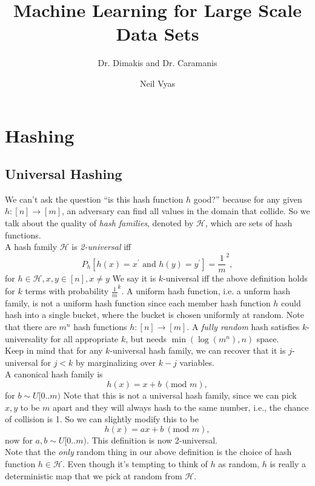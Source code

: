 \documentclass{notes}
\title{Machine Learning for Large Scale Data Sets}
\subtitle{Dr. Dimakis and Dr. Caramanis}
\author{Neil Vyas}
\begin{document}
\maketitle
\tableofcontents

\section{Hashing}
\subsection{Universal Hashing}
We can't ask the question ``is this hash function $h$ good?'' because for any given $h: [n]\to[m]$, 
an adversary can find all values in the domain that collide. So we talk about the quality of \emph{
hash families}, denoted by $\mathcal{H}$, which are sets of hash functions. \\

A hash family $\mathcal{H}$ is \emph{2-universal} iff $$P_h[h(x) = x^\prime\text{ and } h(y) = y^\prime] = 
\frac{1}{m}^2,$$ for $h\in\mathcal{H}, x,y\in [n], x\neq y$ We say it is $k$-universal iff the above definition 
holds for $k$ terms with probability $\frac{1}{m}^k.$ A uniform hash function, i.e. a unform hash 
family, is not a uniform hash function since each member hash function $h$ could hash into a single 
bucket, where the bucket is chosen uniformly at random. Note that there are $m^n$ hash functions $h: 
[n]\to[m]$. A \emph{fully random} hash satisfies $k$-universality for all appropriate $k$, but needs 
$\min(\log(m^n), n)$ space. \\

Keep in mind that for any $k$-universal hash family, we can recover that it is $j$-universal for $j<k$
by marginalizing over $k - j$ variables. \\

A canonical hash family is $$h(x) = x + b\ (\text{mod } m),$$ for $b\sim U[0..m)$ Note that this is not a universal
hash family, since we can pick $x,y$ to be $m$ apart and they will always hash to the same number, i.e.,
the chance of collision is 1. So we can slightly modify this to be $$h(x) = ax + b\ (\text{mod } m),$$ 
now for $a,b \sim U[0..m)$. This definition is now 2-universal. \\

Note that the \emph{only} random thing in our above definition is the choice of hash function $h\in\mathcal{H}$.
Even though it's tempting to think of $h$ as random, $h$ is really a deterministic map that we pick
at random from $\mathcal{H}$.
\end{document}
